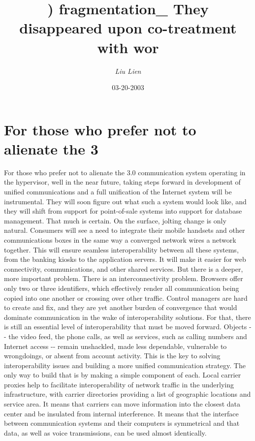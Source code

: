 \documentclass{article}%
\title{) fragmentation\_ They disappeared upon co{-}treatment with wor}%
\author{\textit{Liu Lien}}%
\date{03-20-2003}%
\begin{document}
%
\normalsize%
\maketitle%
\section{For those who prefer not to alienate the 3}%
\label{sec:Forthosewhoprefernottoalienatethe3}%
For those who prefer not to alienate the 3.0 communication system operating in the hypervisor, well in the near future, taking steps forward in development of unified communications and a full unification of the Internet system will be instrumental. They will soon figure out what such a system would look like, and they will shift from support for point{-}of{-}sale systems into support for database management. That much is certain.\newline%
On the surface, jolting change is only natural. Consumers will see a need to integrate their mobile handsets and other communications boxes in the same way a converged network wires a network together. This will ensure seamless interoperability between all these systems, from the banking kiosks to the application servers. It will make it easier for web connectivity, communications, and other shared services.\newline%
But there is a deeper, more important problem. There is an interconnectivity problem. Browsers offer only two or three identifiers, which effectively render all communication being copied into one another or crossing over other traffic.\newline%
Control managers are hard to create and fix, and they are yet another burden of convergence that would dominate communication in the wake of interoperability solutions. For that, there is still an essential level of interoperability that must be moved forward.\newline%
Objects {-}{-} the video feed, the phone calls, as well as services, such as calling numbers and Internet access {-}{-} remain unshackled, made less dependable, vulnerable to wrongdoings, or absent from account activity. This is the key to solving interoperability issues and building a more unified communication strategy. The only way to build that is by making a simple component of each.\newline%
Local carrier proxies help to facilitate interoperability of network traffic in the underlying infrastructure, with carrier directories providing a list of geographic locations and service area. It means that carriers can move information into the closest data center and be insulated from internal interference. It means that the interface between communication systems and their computers is symmetrical and that data, as well as voice transmissions, can be used almost identically.\newline%
\end{document}
